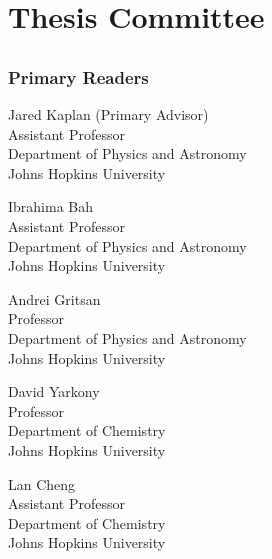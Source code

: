 \chapter*{Thesis Committee}

\section*{}
\subsection*{Primary Readers}

\begin{singlespace}


\indent Jared Kaplan (Primary Advisor)\\
\indent \indent Assistant Professor \\
\indent \indent Department of Physics and Astronomy\\
\indent \indent Johns Hopkins University \\


\smallskip 

\noindent Ibrahima Bah \\
\indent \indent Assistant Professor\\
\indent \indent Department of Physics and Astronomy\\
\indent \indent Johns Hopkins University \\

\smallskip 

\noindent Andrei Gritsan \\
\indent \indent Professor\\
\indent \indent Department of Physics and Astronomy \\
\indent \indent Johns Hopkins University \\

\smallskip

\noindent David Yarkony \\
\indent \indent Professor\\
\indent \indent Department of Chemistry \\
\indent \indent Johns Hopkins University \\

\smallskip

\noindent Lan Cheng \\
\indent \indent Assistant Professor\\
\indent \indent Department of Chemistry \\
\indent \indent Johns Hopkins University \\

\end{singlespace}

